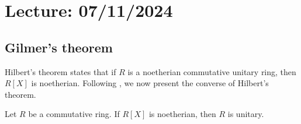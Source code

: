 \section{Lecture: 07/11/2024}



\subsection{Gilmer's theorem}

Hilbert's theorem states that 
if $R$ is a noetherian 
commutative unitary ring, then
$R[X]$ is noetherian. Following \cite{MR212007}, 
we now present the converse of Hilbert's theorem. 

\begin{theorem}[Gilmer]
    Let $R$ be a commutative ring. If $R[X]$ is noetherian, 
    then $R$ is unitary. 
\end{theorem}

